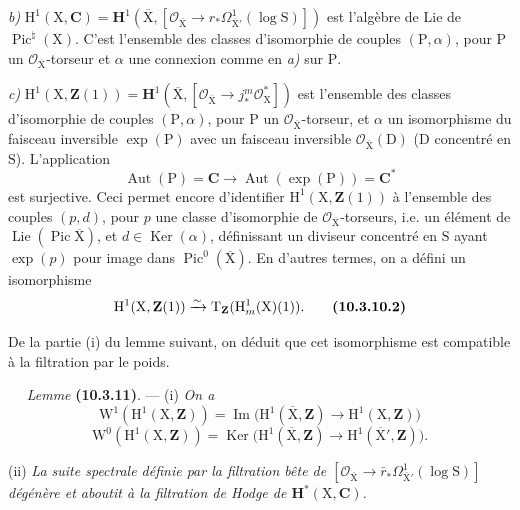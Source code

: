 \documentclass[11pt,leqno]{article}
\newcommand{\Page}[1]{\ifvmode\noindent\else\unskip\ \fi{\footnotesize\textcolor{gray}{[p.\,#1]}}\ \ignorespaces}
\begin{document}
\textit{b)} \(\mathrm{H}^{1}(\mathrm{X},\mathbf{C})=\mathbf{H}^{1}(\overline{\mathrm{X}},[\mathcal{O}_{\overline{\mathrm{X}}}\to r_*\Omega^{1}_{\overline{\mathrm{X}}'}(\log\mathrm{S})])\) est l’algèbre de Lie de \(\operatorname{Pic}^{\natural}(\mathrm{X})\). C’est l’ensemble des classes d’isomorphie de couples \((\mathrm{P},\alpha)\), pour \(\mathrm{P}\) un \(\mathcal{O}_{\overline{\mathrm{X}}}\)-torseur et \(\alpha\) une connexion comme en \textit{a)} sur \(\mathrm{P}\).

\textit{c)} \(\mathrm{H}^{1}(\mathrm{X},\mathbf{Z}(1))=\mathbf{H}^{1}(\overline{\mathrm{X}},[\mathcal{O}_{\overline{\mathrm{X}}}\to j_*^{m}\mathcal{O}_{\mathrm{X}}^{*}])\) est l’ensemble des classes d’isomorphie de couples \((\mathrm{P},\alpha)\), pour \(\mathrm{P}\) un \(\mathcal{O}_{\overline{\mathrm{X}}}\)-torseur, et \(\alpha\) un isomorphisme du faisceau inversible \(\exp(\mathrm{P})\) avec un faisceau inversible \(\mathcal{O}_{\overline{\mathrm{X}}}(\mathrm{D})\) (\(\mathrm{D}\) concentré en \(\mathrm{S}\)). L’application
\[
\operatorname{Aut}(\mathrm{P})=\mathbf{C}
\longrightarrow\operatorname{Aut}(\exp(\mathrm{P}))=\mathbf{C}^{*}
\]
est surjective. Ceci permet encore d’identifier \(\mathrm{H}^{1}(\mathrm{X},\mathbf{Z}(1))\) à l’ensemble des couples \((p,d)\), pour \(p\) une classe d’isomorphie de \(\mathcal{O}_{\overline{\mathrm{X}}}\)-torseurs, i.e. un élément de \(\operatorname{Lie}(\operatorname{Pic}\overline{\mathrm{X}})\), et \(d\in\operatorname{Ker}(\alpha)\), définissant un diviseur concentré en \(\mathrm{S}\) ayant \(\exp(p)\) pour image dans \(\operatorname{Pic}^{0}(\overline{\mathrm{X}})\). En d’autres termes, on a défini un isomorphisme
\[
\mathrm{H}^{1}(\mathrm{X},\mathbf{Z}(1))
\xrightarrow{\sim}
\mathrm{T}_{\mathbf{Z}}(\mathrm{H}^{1}_{m}(\mathrm{X})(1)).
\tag*{\textbf{(10.3.10.2)}}
\]

De la partie (i) du lemme suivant, on déduit que cet isomorphisme est compatible à la filtration par le poids.

\Page{73}
\textit{Lemme} \textbf{(10.3.11)}. — (i) \textit{On a}
\[
\mathrm{W}^{1}(\mathrm{H}^{1}(\mathrm{X},\mathbf{Z}))
=\operatorname{Im}\bigl(
\mathrm{H}^{1}(\overline{\mathrm{X}},\mathbf{Z})
\to\mathrm{H}^{1}(\mathrm{X},\mathbf{Z})\bigr)
\]
\[
\mathrm{W}^{0}(\mathrm{H}^{1}(\mathrm{X},\mathbf{Z}))
=\operatorname{Ker}\bigl(
\mathrm{H}^{1}(\overline{\mathrm{X}},\mathbf{Z})
\to\mathrm{H}^{1}(\overline{\mathrm{X}}',\mathbf{Z})\bigr).
\]

(ii) \textit{La suite spectrale définie par la filtration bête de
\([\mathcal{O}_{\overline{\mathrm{X}}}\to
\bar r_*\Omega^{1}_{\overline{\mathrm{X}}'}(\log\mathrm{S})]\)
dégénère et aboutit à la filtration de Hodge de
\(\mathbf{H}^{*}(\mathrm{X},\mathbf{C})\).}
\end{document}

